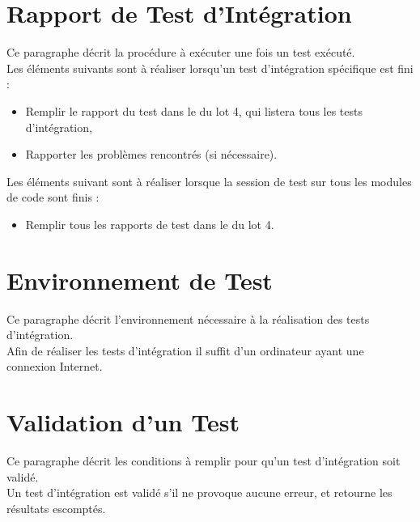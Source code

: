   \section{Rapport de Test d'Intégration}  
  	Ce paragraphe décrit la procédure à exécuter une fois un test exécuté.  \\
  	
  	Les éléments suivants sont à réaliser lorsqu'un test d'intégration spécifique est fini : 
  	\begin{itemize}
  		\item Remplir le rapport du test dans le \JTI du lot 4, qui listera tous les tests d'intégration,
  		\item Rapporter les problèmes rencontrés (si nécessaire).
  	\end{itemize}
  	
  	Les éléments suivant sont à réaliser lorsque la session de test sur tous les modules de code sont finis : 
  	\begin{itemize}
  		\item Remplir tous les rapports de test dans le \JTI du lot 4.
  	\end{itemize}
  
  \section{Environnement de Test}
	  Ce paragraphe décrit l'environnement nécessaire à la réalisation des tests d'intégration. \\
	  
	  Afin de réaliser les tests d'intégration il suffit d'un ordinateur ayant une connexion Internet.
  
  \section{Validation d'un Test}
	Ce paragraphe décrit les conditions à remplir pour qu'un test d'intégration soit validé.\\
  
  	Un test d'intégration est validé s'il ne provoque aucune erreur, et retourne les résultats escomptés. 
  	
  	